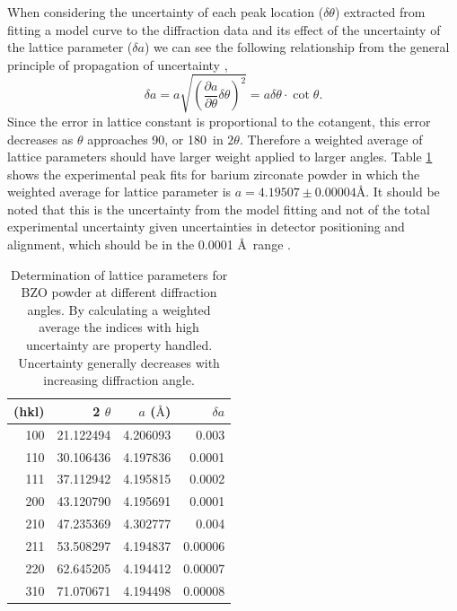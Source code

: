 When considering the uncertainty of each peak location ($\delta\theta$) extracted from fitting a model curve to the diffraction data and its effect of the uncertainty of the lattice parameter ($\delta a$) we can see the following relationship from the general principle of propagation of uncertainty \cite{Taylor1997},
\begin{equation}
\delta a = a \sqrt{\left(\frac{\partial a}{\partial \theta}\delta \theta\right)^2} = a \delta \theta \cdot \cot{\theta}.
\end{equation}Since the error in lattice constant is proportional to the cotangent, this error decreases as $\theta$ approaches 90\textdegree, or 180\textdegree\ in $2\theta$. Therefore a weighted average of lattice parameters should have larger weight applied to larger angles. Table \ref{tab:xrd:latticeParameterCalculation} shows the experimental peak fits for barium zirconate powder in which the weighted average for lattice parameter is $a = 4.19507 \pm 0.00004$\AA. It should be noted that this is the uncertainty from the model fitting and not of the total experimental uncertainty given uncertainties in detector positioning and alignment, which should be in the 0.0001 \AA\ range \cite{Herbstein2000}.

\begin{table}[tb]
    \centering
    \caption{Determination of lattice parameters for BZO powder at different diffraction angles. By calculating a weighted average the indices with high uncertainty are property handled. Uncertainty generally decreases with increasing diffraction angle.}
    \begin{tabular}{rrrr}
        \toprule
         (hkl) &    2 $\theta$ &         $a$ ($\mbox{\AA}$) &       $\delta a$  \\
        \midrule \midrule
         100 &  21.122494 &  4.206093 &  0.003 \\
         110 &  30.106436 &  4.197836 &  0.0001 \\
         111 &  37.112942 &  4.195815 &  0.0002 \\
         200 &  43.120790 &  4.195691 &  0.0001 \\
         210 &  47.235369 &  4.302777 &  0.004 \\
         211 &  53.508297 &  4.194837 &  0.00006 \\
         220 &  62.645205 &  4.194412 &  0.00007 \\
         310 &  71.070671 &  4.194498 &  0.00008 \\
        \bottomrule
        \end{tabular}
    \label{tab:xrd:latticeParameterCalculation}
\end{table}

